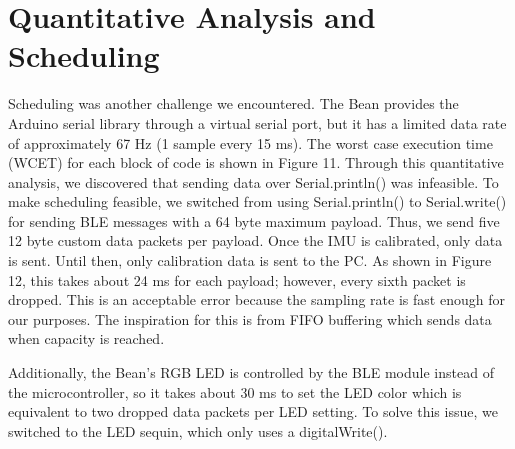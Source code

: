\documentclass[10pt,journal]{IEEEtran}
\begin{document}
\section{Quantitative Analysis and Scheduling}
Scheduling was another challenge we encountered. The Bean provides the Arduino serial library through a virtual serial port, but it has a limited data rate of approximately 67 Hz (1 sample every 15 ms). The worst case execution time (WCET) for each block of code is shown in Figure 11. Through this quantitative analysis, we discovered that sending data over Serial.println() was infeasible.
   To make scheduling feasible, we switched from using Serial.println() to Serial.write() for sending BLE messages with a 64 byte maximum payload. Thus, we send five 12 byte custom data packets per payload. Once the IMU is calibrated, only data is sent. Until then, only calibration data is sent to the PC. As shown in Figure 12, this takes about 24 ms for each payload; however, every sixth packet is dropped. This is an acceptable error because the sampling rate is fast enough for our purposes. The inspiration for this is from FIFO buffering which sends data when capacity is reached.
\par Additionally, the Bean’s RGB LED is controlled by the BLE module instead of the microcontroller, so it takes about 30 ms to set the LED color which is equivalent to two dropped data packets per LED setting. To solve this issue, we switched to the LED sequin, which only uses a digitalWrite(). 
  
\end{document}
